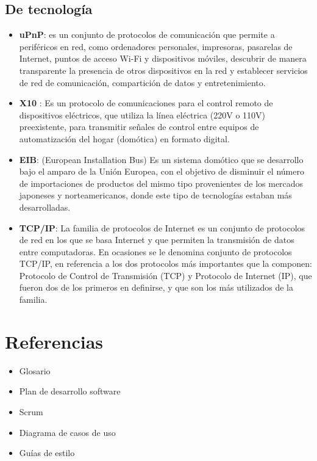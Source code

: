     \subsection{De tecnología}
    	\begin{itemize}
    		\item {\bf uPnP}: es un conjunto de protocolos de comunicación que permite a periféricos en red, como ordenadores personales, impresoras, pasarelas de Internet, puntos de acceso Wi-Fi y dispositivos móviles, descubrir de manera transparente la presencia de otros dispositivos en la red y establecer servicios de red de comunicación, compartición de datos y entretenimiento.
    		\item {\bf X10 }: Es un protocolo de comunicaciones para el control remoto de dispositivos eléctricos, que utiliza la línea eléctrica (220V o 110V) preexistente, para transmitir señales de control entre equipos de automatización del hogar (domótica) en formato digital.
    		\item {\bf EIB}: (European Installation Bus) Es un sistema domótico que se desarrollo bajo el
    		amparo de la Unión Europea, con el objetivo de disminuir el número de importaciones de
    		productos del mismo tipo provenientes de los mercados japoneses y norteamericanos,
    		donde este tipo de tecnologías estaban más desarrolladas.
    		\item {\bf TCP/IP}: La familia de protocolos de Internet es un conjunto de protocolos de red en los que se basa Internet y que permiten la transmisión de datos entre computadoras. En ocasiones se le denomina conjunto de protocolos TCP/IP, en referencia a los dos protocolos más importantes que la componen: Protocolo de Control de Transmisión (TCP) y Protocolo de Internet (IP), que fueron dos de los primeros en definirse, y que son los más utilizados de la familia. 
    	\end{itemize}
    	

\section{Referencias}
    \begin{itemize}
        \item Glosario
        \item Plan de desarrollo software
        \item Scrum
        \item Diagrama de casos de uso
        \item Guías de estilo
    \end{itemize}
